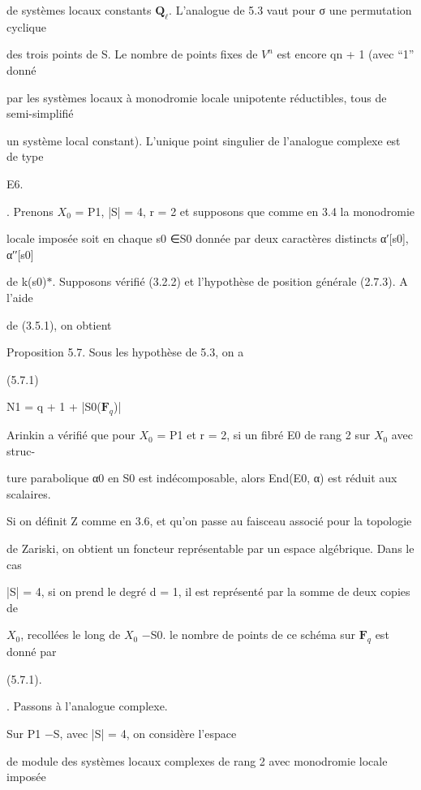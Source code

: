 \documentclass[11pt]{article}
\begin{document}
\noindent de systèmes locaux constants \(\mathbf Q_{\ell}\). L’analogue de 5.3 vaut pour σ une permutation cyclique\par
\noindent des trois points de S. Le nombre de points fixes de \(V^n\) est encore qn + 1 (avec “1” donné\par
\noindent par les systèmes locaux à monodromie locale unipotente réductibles, tous de semi-simplifié\par
\noindent un système local constant). L’unique point singulier de l’analogue complexe est de type\par
\noindent E6.\par
{}. Prenons \(X_0\) = P1, |S| = 4, r = 2 et supposons que comme en 3.4 la monodromie\par
\noindent locale imposée soit en chaque s0 ∈S0 donnée par deux caractères distincts α′[s0], α′′[s0]\par
\noindent de k(s0)\(*\). Supposons vérifié (3.2.2) et l’hypothèse de position générale (2.7.3). A l’aide\par
\noindent de (3.5.1), on obtient\par
\noindent Proposition 5.7. Sous les hypothèse de 5.3, on a\par
\noindent (5.7.1)\par
\noindent N1 = q + 1 + |S0(\(\mathbf F_q\))|\par
\noindent Arinkin a vérifié que pour \(X_0\) = P1 et r = 2, si un fibré E0 de rang 2 sur \(X_0\) avec struc-\par
\noindent ture parabolique α0 en S0 est indécomposable, alors End(E0, α) est réduit aux scalaires.\par
\medskip
\noindent Si on définit Z comme en 3.6, et qu’on passe au faisceau associé pour la topologie\par
\noindent de Zariski, on obtient un foncteur représentable par un espace algébrique. Dans le cas\par
\noindent |S| = 4, si on prend le degré d = 1, il est représenté par la somme de deux copies de\par
\noindent \(X_0\), recollées le long de \(X_0\) −S0. le nombre de points de ce schéma sur \(\mathbf F_q\) est donné par\par
\noindent (5.7.1).\par
{}. Passons à l’analogue complexe.\par
\noindent Sur P1 −S, avec |S| = 4, on considère l’espace\par
\noindent de module des systèmes locaux complexes de rang 2 avec monodromie locale imposée\par
\end{document}
